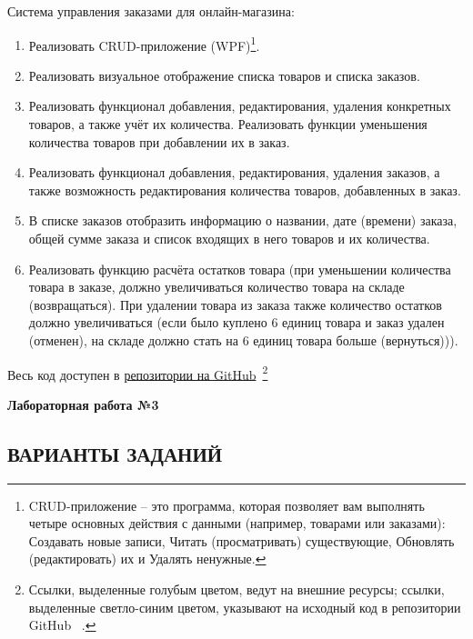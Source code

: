 \documentclass[12pt]{article}
\newcommand{\lablogo}
{
\begin{center}
    \huge{\textbf{Лабораторная работа №3}} \\
\end{center}
}
\newcommand{\colorURL}[1]{\textcolor{CtpBlue}{#1}}
\newcommand{\colorGIT}[1]{\textcolor{CtpLavender}{#1}}
\renewcommand{\texttt}[1]{{\small\ttfamily #1}}
\begin{document}
\noindent Система управления заказами для онлайн-магазина:
\begin{enumerate}
	\item Реализовать \texttt{CRUD}-приложение (\texttt{WPF})\footnote{\texttt{CRUD}-приложение -- это программа, которая позволяет вам выполнять четыре основных действия с данными (например, товарами или заказами): Создавать новые записи, Читать (просматривать) существующие, Обновлять (редактировать) их и Удалять ненужные.}.
	\item Реализовать визуальное отображение списка товаров и списка заказов.
	\item Реализовать функционал добавления, редактирования, удаления конкретных товаров, а также учёт их количества. Реализовать функции уменьшения количества товаров при добавлении их в заказ.
	\item Реализовать функционал добавления, редактирования, удаления заказов, а также возможность редактирования количества товаров, добавленных в заказ.
	\item В списке заказов отобразить информацию о названии, дате (времени) заказа, общей сумме заказа и список входящих в него товаров и их количества.
	\item Реализовать функцию расчёта остатков товара (при уменьшении количества товара в заказе, должно увеличиваться количество товара на складе (возвращаться). При удалении товара из заказа также количество остатков должно увеличиваться (если было куплено 6 единиц товара и заказ удален (отменен), на складе должно стать на 6 единиц товара больше (вернуться))).
\end{enumerate}
Весь код доступен в \colorURL{\href{https://github.com/WebMasterIT/Csharp_Labs/tree/main}{репозитории на GitHub}\ \faGithub}\footnote{Ссылки, выделенные \colorURL{голубым} цветом, ведут на внешние ресурсы; ссылки, выделенные \colorGIT{светло-синим} цветом, указывают на исходный код в репозитории GitHub \ \faGithub.}

\newpage

\lablogo

\begin{center}
	\subsection{ВАРИАНТЫ ЗАДАНИЙ \ \texorpdfstring{\faTasks}{}}
\end{center}
\end{document}
